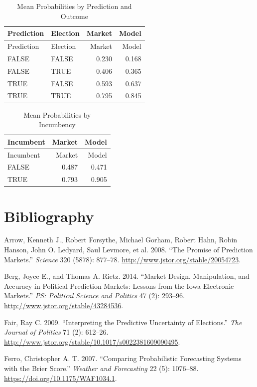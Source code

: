 \documentclass[11pt,]{article}
\begin{document}
\begin{longtable}[]{@{}llrr@{}}
\caption{Mean Probabilities by Prediction and Outcome}\tabularnewline
\toprule
Prediction & Election & Market & Model\tabularnewline
\midrule
\endfirsthead
\toprule
Prediction & Election & Market & Model\tabularnewline
\midrule
\endhead
FALSE & FALSE & 0.230 & 0.168\tabularnewline
FALSE & TRUE & 0.406 & 0.365\tabularnewline
TRUE & FALSE & 0.593 & 0.637\tabularnewline
TRUE & TRUE & 0.795 & 0.845\tabularnewline
\bottomrule
\end{longtable}

\begin{longtable}[]{@{}lrr@{}}
\caption{Mean Probabilities by Incumbency}\tabularnewline
\toprule
Incumbent & Market & Model\tabularnewline
\midrule
\endfirsthead
\toprule
Incumbent & Market & Model\tabularnewline
\midrule
\endhead
FALSE & 0.487 & 0.471\tabularnewline
TRUE & 0.793 & 0.905\tabularnewline
\bottomrule
\end{longtable}

\hypertarget{bibliography}{%
\section*{Bibliography}\label{bibliography}}

\hypertarget{refs}{}
\leavevmode\hypertarget{ref-arrow08promise}{}%
Arrow, Kenneth J., Robert Forsythe, Michael Gorham, Robert Hahn, Robin
Hanson, John O. Ledyard, Saul Levmore, et al. 2008. ``The Promise of
Prediction Markets.'' \emph{Science} 320 (5878): 877--78.
\url{http://www.jstor.org/stable/20054723}.

\leavevmode\hypertarget{ref-berg14iem}{}%
Berg, Joyce E., and Thomas A. Rietz. 2014. ``Market Design,
Manipulation, and Accuracy in Political Prediction Markets: Lessons from
the Iowa Electronic Markets.'' \emph{PS: Political Science and Politics}
47 (2): 293--96. \url{http://www.jstor.org/stable/43284536}.

\leavevmode\hypertarget{ref-fair09uncertainty}{}%
Fair, Ray C. 2009. ``Interpreting the Predictive Uncertainty of
Elections.'' \emph{The Journal of Politics} 71 (2): 612--26.
\url{http://www.jstor.org/stable/10.1017/s0022381609090495}.

\leavevmode\hypertarget{ref-ferro07brier}{}%
Ferro, Christopher A. T. 2007. ``Comparing Probabilistic Forecasting
Systems with the Brier Score.'' \emph{Weather and Forecasting} 22 (5):
1076--88. \url{https://doi.org/10.1175/WAF1034.1}.
\end{document}
